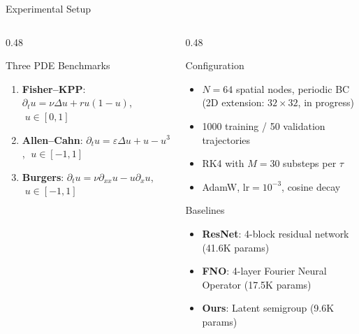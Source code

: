 \documentclass[aspectratio=169, 11pt]{beamer}
\begin{document}
\begin{frame}{Experimental Setup}

\begin{columns}[T]
\begin{column}{0.48\textwidth}
\begin{block}{Three PDE Benchmarks}
\begin{enumerate}
    \item \textbf{Fisher--KPP}: $\partial_t u = \nu\Delta u + ru(1{-}u)$, $\;u \in [0,1]$
    \item \textbf{Allen--Cahn}: $\partial_t u = \varepsilon\Delta u + u - u^3$, $\;u \in [-1,1]$
    \item \textbf{Burgers}: $\partial_t u = \nu\partial_{xx}u - u\partial_x u$, $\;u \in [-1,1]$
\end{enumerate}
\end{block}
\end{column}

\begin{column}{0.48\textwidth}
\begin{block}{Configuration}
\begin{itemize}
    \item $N = 64$ spatial nodes, periodic BC\\[2pt]\textcolor{blue!70}{\scriptsize (2D extension: $32\times32$, in progress)}
    \item 1000 training / 50 validation trajectories
    \item RK4 with $M = 30$ substeps per $\tau$
    \item AdamW, lr$=10^{-3}$, cosine decay
\end{itemize}
\end{block}

\begin{block}{Baselines}
\begin{itemize}
    \item \textbf{ResNet}: 4-block residual network (41.6K params)
    \item \textbf{FNO}: 4-layer Fourier Neural Operator (17.5K params)
    \item \textbf{Ours}: Latent semigroup (9.6K params)
\end{itemize}
\end{block}
\end{column}
\end{columns}
\end{frame}
\end{document}
